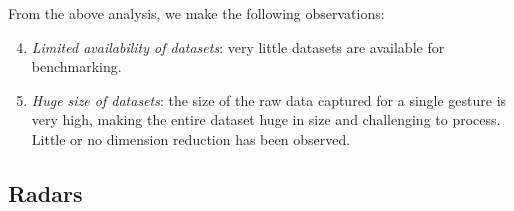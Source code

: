 From the above analysis, we make the following observations:
\begin{enumerate}
\setcounter{enumi}{3}
    \item \textit{Limited availability of datasets}: very little datasets are available for benchmarking.
    \item \textit{Huge size of datasets}: the size of the raw data captured for a single gesture is very high, making the entire dataset huge in size and challenging to process. Little or no dimension reduction has been observed.
\end{enumerate}

\subsection{Radars} \label{sec:state_of_the_art:radar:sensors}

